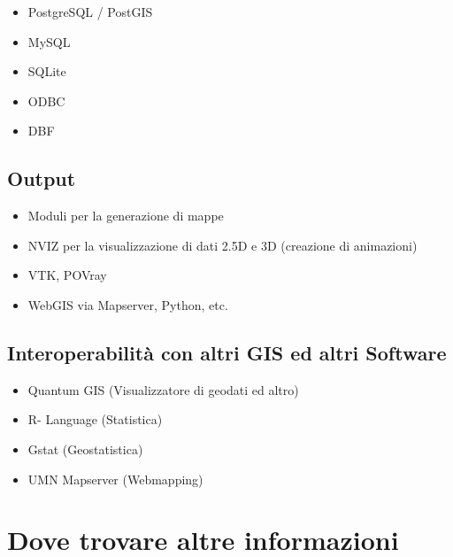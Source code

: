 \documentclass[notumble,a4paper,10pt,nofoldmark]{leaflet}
\begin{document}
\begin{itemize}
\item PostgreSQL / PostGIS
\item MySQL
\item SQLite
\item ODBC
\item DBF
\end{itemize}

\subsection{Output}

\begin{itemize}
\item Moduli per la generazione di mappe
\item NVIZ per la visualizzazione di dati 2.5D e 3D (creazione di animazioni)
\item VTK, POVray
\item WebGIS via Mapserver, Python, etc.
\end{itemize}

\subsection{Interoperabilit\`a con altri GIS ed altri Software}

\begin{itemize}
\item Quantum GIS (Visualizzatore di geodati ed altro)
\item R- Language (Statistica)
\item Gstat (Geostatistica)
\item UMN Mapserver (Webmapping)
\end{itemize}

\section{Dove trovare altre informazioni}
\end{document}
